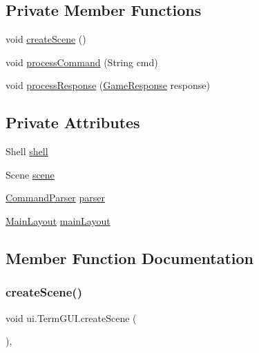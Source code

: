 \subsection*{Private Member Functions}
\begin{DoxyCompactItemize}
\item 
void \mbox{\hyperlink{classui_1_1_term_g_u_i_ab4733b3f54899f4563a298931686cad0}{create\+Scene}} ()
\item 
void \mbox{\hyperlink{classui_1_1_term_g_u_i_a8ef774ab2fe02b2469e7b675ba9c5a4d}{process\+Command}} (String cmd)
\item 
void \mbox{\hyperlink{classui_1_1_term_g_u_i_aa1c37916b26b5ecb5e98a88621cb03c1}{process\+Response}} (\mbox{\hyperlink{classui_1_1_game_response}{Game\+Response}} response)
\end{DoxyCompactItemize}
\subsection*{Private Attributes}
\begin{DoxyCompactItemize}
\item 
Shell \mbox{\hyperlink{classui_1_1_term_g_u_i_a343f6c640dec4f4357f565cc6e03deea}{shell}}
\item 
Scene \mbox{\hyperlink{classui_1_1_term_g_u_i_a5e4ab9c099195df8cb9312bfa0c7fa03}{scene}}
\item 
\mbox{\hyperlink{classui_1_1_command_parser}{Command\+Parser}} \mbox{\hyperlink{classui_1_1_term_g_u_i_a67c20b5b856c96507a6a3c066a148880}{parser}}
\item 
\mbox{\hyperlink{classui_1_1_u_i_elements_1_1_main_layout}{Main\+Layout}} \mbox{\hyperlink{classui_1_1_term_g_u_i_a82f6077413341f13111d4a8705e6cff0}{main\+Layout}}
\end{DoxyCompactItemize}


\subsection{Member Function Documentation}
\mbox{\label{classui_1_1_term_g_u_i_ab4733b3f54899f4563a298931686cad0}} 
\subsubsection{\texorpdfstring{create\+Scene()}{createScene()}}
{\footnotesize\ttfamily void ui.\+Term\+G\+U\+I.\+create\+Scene (\begin{DoxyParamCaption}{ }\end{DoxyParamCaption})\hspace{0.3cm}{\ttfamily [inline]}, {\ttfamily [private]}}


